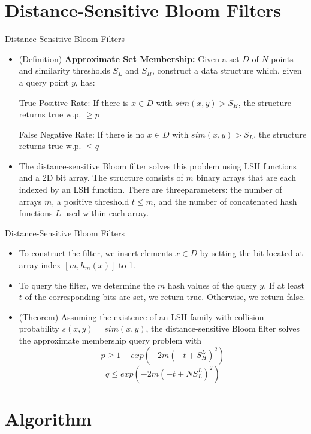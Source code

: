 \documentclass[Serif, 10pt, brown]{beamer}
\theoremstyle{example}
\theoremstyle{plain}
\begin{document}
\section{Distance-Sensitive Bloom Filters}
\begin{frame}{Distance-Sensitive Bloom Filters}
	\begin{itemize}
		\item (Definition) {\bf Approximate Set Membership:} Given a set $D$ of $N$ points and similarity thresholds
		$S_L$ and $S_H$, construct a data structure which, given a query point $y$, has:

		True Positive Rate: If there is $x \in D$ with $sim(x,y) >S_H$, the structure returns true w.p. $ \geq p$

		False Negative Rate: If there is no $x \in D$ with $sim(x,y) > S_L$, the structure returns true w.p. $\leq q$

	\item The distance-sensitive Bloom filter solves this problem using LSH functions and a 2D bit array. The structure consists of $m$ binary arrays that are each indexed by an LSH function. There are threeparameters: the number of arrays $m$, a positive threshold $t \leq m$, and the number of concatenated hash functions $L$ used within each array.  
	\end{itemize}
\end{frame}

\begin{frame}{Distance-Sensitive Bloom Filters}
	\begin{itemize}
		\item To construct the filter, we insert elements $x \in D$ by setting the bit located at array index $[m,h_m(x)]$ to 1. 
		\item To query the filter, we determine the $m$ hash values of the query $y$. If at least $t$ of the corresponding
		bits are set, we return true. Otherwise, we return false. 
		\item (Theorem) Assuming the existence of an LSH family with collision probability $s(x,y) = sim(x,y)$,
		the distance-sensitive Bloom filter solves the approximate membership query problem with
		\[p \geq 1 - exp\left(-2m(-t + S_H^L)^2\right)\]
		\[q \leq exp\left(-2m(-t + NS_L^L)^2\right)\]
	\end{itemize}
\end{frame}

\section{Algorithm}
\end{document}
